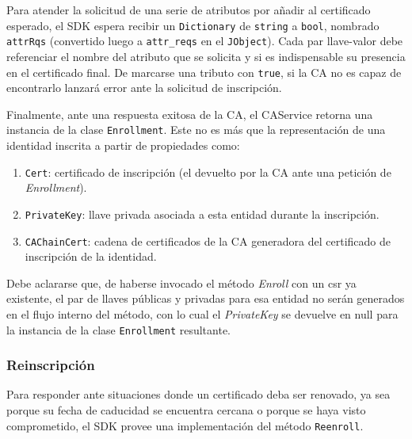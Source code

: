 
Para atender la solicitud de una serie de atributos por a\~nadir al certificado esperado, el SDK espera recibir un \texttt{Dictionary} de \texttt{string} a \texttt{bool}, nombrado \texttt{attrRqs} (convertido luego a \texttt{attr\_reqs} en el \texttt{JObject}). Cada par llave-valor debe referenciar el nombre del atributo que se solicita y si es indispensable su presencia en el certificado final. De marcarse una tributo con \texttt{true}, si la CA no es capaz de encontrarlo lanzar\'a error ante la solicitud de inscripci\'on.

Finalmente, ante una respuesta exitosa de la CA, el CAService retorna una instancia de la clase \texttt{Enrollment}. Este no es m\'as que la representaci\'on de una identidad inscrita a partir de propiedades como:
\begin{enumerate}
	\item \texttt{Cert}: certificado de inscripci\'on (el devuelto por la CA ante una petici\'on de \emph{Enrollment}).
	
	\item \texttt{PrivateKey}: llave privada asociada a esta entidad durante la inscripci\'on.
	
	\item \texttt{CAChainCert}: cadena de certificados de la CA generadora del certificado de inscripci\'on de la identidad.
\end{enumerate} 

Debe aclararse que, de haberse invocado el m\'etodo \emph{Enroll} con un csr ya existente, el par de llaves p\'ublicas y privadas para esa entidad no ser\'an generados en el flujo interno del m\'etodo, con lo cual el \emph{PrivateKey} se devuelve en null para la instancia de la clase \texttt{Enrollment} resultante.

\subsubsection{Reinscripci\'on}

Para responder ante situaciones donde un certificado deba ser renovado, ya sea porque su fecha de caducidad se encuentra cercana o porque se haya visto comprometido, el SDK provee una implementaci\'on del m\'etodo \texttt{Reenroll}.

